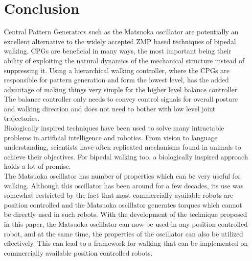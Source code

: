 \documentclass[12pt,twoside]{article}
\theoremstyle{plain}
\theoremstyle{definition}
\theoremstyle{remark}
\newcommand{\forceindent}{\leavevmode{\parindent=2em\indent}}
\begin{document}
\section{Conclusion}
\label{sec:Conclusion}
Central Pattern Generators such as the Matsuoka oscillator are potentially an excellent alternative to the widely accepted ZMP based techniques of bipedal walking. CPGs are beneficial in many ways, the most important being their ability of exploiting the natural dynamics of the mechanical structure instead of suppressing it. Using a hierarchical walking controller, where the CPGs are responsible for pattern generation and form the lowest level, has the added advantage of making things very simple for the higher level balance controller. The balance controller only needs to convey control signals for overall posture and walking direction and does not need to bother with low level joint trajectories.\\
\forceindent Biologically inspired techniques have been used to solve many intractable problems in artificial intelligence and robotics. From vision to language understanding, scientists have often replicated mechanisms found in animals to achieve their objectives. For bipedal walking too, a biologically inspired approach holds a lot of promise.\\
\forceindent The Matsuoka oscillator has number of properties which can be very useful for walking. Although this  oscillator has been around for a few decades, its use was somewhat restricted by the fact that most commercially available robots are position controlled and the Matsuoka oscillator generates torques which cannot be directly used in such robots. With the development of the technique proposed in this paper, the Matsuoka oscillator can now be used in any position controlled robot, and at the same time, the properties of the oscillator can also be utilized effectively. This can lead to a framework for walking that can be implemented on commercially available position controlled robots.
\end{document}
